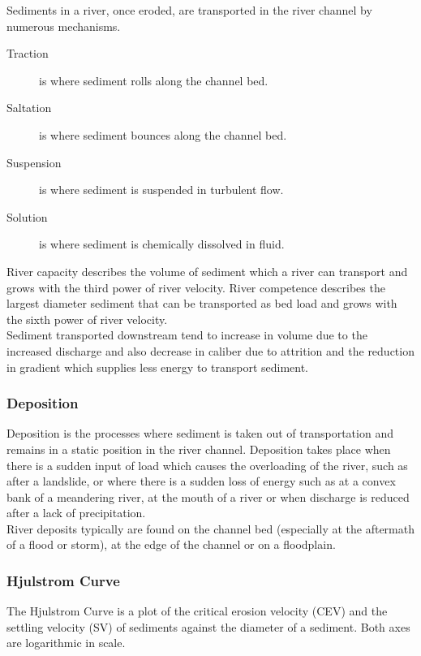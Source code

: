 \documentclass[../../main]{subfiles}
\begin{document}
	Sediments in a river, once eroded, are transported in the river channel by numerous mechanisms.

	\begin{description}
		\item[Traction] is where sediment rolls along the channel bed.
		\item[Saltation] is where sediment bounces along the channel bed.
		\item[Suspension] is where sediment is suspended in turbulent flow.
		\item[Solution] is where sediment is chemically dissolved in fluid.
	\end{description}

	River capacity describes the volume of sediment which a river can transport and grows with the third power of river velocity. River competence describes the largest diameter sediment that can be transported as bed load and grows with the sixth power of river velocity. \\

	Sediment transported downstream tend to increase in volume due to the increased discharge and also decrease in caliber due to attrition and the reduction in gradient which supplies less energy to transport sediment.

\subsubsection{Deposition}

	Deposition is the processes where sediment is taken out of transportation and remains in a static position in the river channel. Deposition takes place when there is a sudden input of load which causes the overloading of the river, such as after a landslide, or where there is a sudden loss of energy such as at a convex bank of a meandering river, at the mouth of a river or when discharge is reduced after a lack of precipitation. \\

	River deposits typically are found on the channel bed (especially at the aftermath of a flood or storm), at the edge of the channel or on a floodplain. \\

\subsubsection{Hjulstrom Curve}

	The Hjulstrom Curve is a plot of the critical erosion velocity (CEV) and the settling velocity  (SV) of sediments against the diameter of a sediment. Both axes are logarithmic in scale. \\
\end{document}
